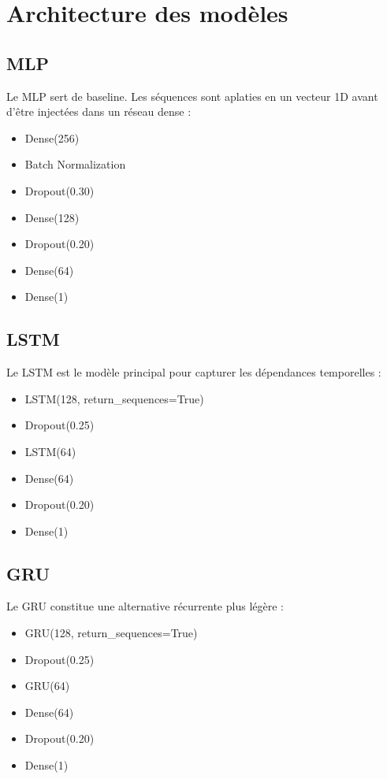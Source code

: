\documentclass[11pt,a4paper]{article}
\begin{document}
\section{Architecture des modèles}

\subsection{MLP}
Le MLP sert de baseline. Les séquences sont aplaties en un vecteur 1D avant d'être injectées dans un réseau dense :

\begin{itemize}
    \item Dense(256)
    \item Batch Normalization
    \item Dropout(0.30)
    \item Dense(128)
    \item Dropout(0.20)
    \item Dense(64)
    \item Dense(1)
\end{itemize}

\subsection{LSTM}
Le LSTM est le modèle principal pour capturer les dépendances temporelles :

\begin{itemize}
    \item LSTM(128, return\_sequences=True)
    \item Dropout(0.25)
    \item LSTM(64)
    \item Dense(64)
    \item Dropout(0.20)
    \item Dense(1)
\end{itemize}

\subsection{GRU}
Le GRU constitue une alternative récurrente plus légère :

\begin{itemize}
    \item GRU(128, return\_sequences=True)
    \item Dropout(0.25)
    \item GRU(64)
    \item Dense(64)
    \item Dropout(0.20)
    \item Dense(1)
\end{itemize}
\end{document}

